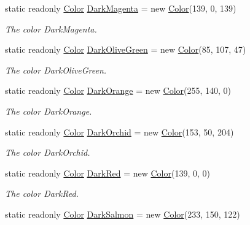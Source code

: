 \begin{DoxyCompactItemize}
static readonly \hyperlink{struct_tri_devs_1_1_tri_engine_1_1_color}{Color} \hyperlink{struct_tri_devs_1_1_tri_engine_1_1_color_a752b6dab067b6ad2b2566fcd4cd41488}{Dark\-Magenta} = new \hyperlink{struct_tri_devs_1_1_tri_engine_1_1_color}{Color}(139, 0, 139)
\begin{DoxyCompactList}\small\item\em The color Dark\-Magenta. \end{DoxyCompactList}\item 
static readonly \hyperlink{struct_tri_devs_1_1_tri_engine_1_1_color}{Color} \hyperlink{struct_tri_devs_1_1_tri_engine_1_1_color_a6179dc097d9934cd1757d19e16ac2e2b}{Dark\-Olive\-Green} = new \hyperlink{struct_tri_devs_1_1_tri_engine_1_1_color}{Color}(85, 107, 47)
\begin{DoxyCompactList}\small\item\em The color Dark\-Olive\-Green. \end{DoxyCompactList}\item 
static readonly \hyperlink{struct_tri_devs_1_1_tri_engine_1_1_color}{Color} \hyperlink{struct_tri_devs_1_1_tri_engine_1_1_color_a8559890ec55a418bc112090a8423e087}{Dark\-Orange} = new \hyperlink{struct_tri_devs_1_1_tri_engine_1_1_color}{Color}(255, 140, 0)
\begin{DoxyCompactList}\small\item\em The color Dark\-Orange. \end{DoxyCompactList}\item 
static readonly \hyperlink{struct_tri_devs_1_1_tri_engine_1_1_color}{Color} \hyperlink{struct_tri_devs_1_1_tri_engine_1_1_color_a1a7243e0a7ae67b867652883572d8ac5}{Dark\-Orchid} = new \hyperlink{struct_tri_devs_1_1_tri_engine_1_1_color}{Color}(153, 50, 204)
\begin{DoxyCompactList}\small\item\em The color Dark\-Orchid. \end{DoxyCompactList}\item 
static readonly \hyperlink{struct_tri_devs_1_1_tri_engine_1_1_color}{Color} \hyperlink{struct_tri_devs_1_1_tri_engine_1_1_color_a3b1add606f86df6acc09be7ba1ca8431}{Dark\-Red} = new \hyperlink{struct_tri_devs_1_1_tri_engine_1_1_color}{Color}(139, 0, 0)
\begin{DoxyCompactList}\small\item\em The color Dark\-Red. \end{DoxyCompactList}\item 
static readonly \hyperlink{struct_tri_devs_1_1_tri_engine_1_1_color}{Color} \hyperlink{struct_tri_devs_1_1_tri_engine_1_1_color_aeeac5e9a1c6cd995bed67588b2860361}{Dark\-Salmon} = new \hyperlink{struct_tri_devs_1_1_tri_engine_1_1_color}{Color}(233, 150, 122)

\end{DoxyCompactItemize}
